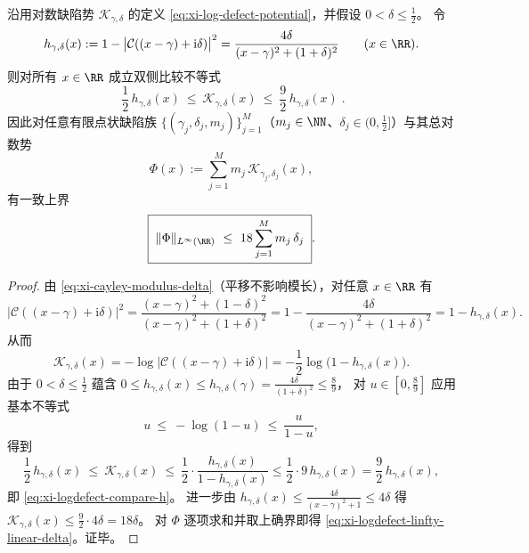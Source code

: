 \begin{proposition}\label{prop:xi-log-defect-potential-linfty-bound-by-total-delta}
沿用对数缺陷势 \(\mathcal{K}_{\gamma,\delta}\) 的定义 \eqref{eq:xi-log-defect-potential}，并假设 \(0<\delta\le \tfrac12\)。
令
\[
h_{\gamma,\delta}(x):=1-\bigl|\mathcal{C}((x-\gamma)+\mathrm{i}\delta)\bigr|^2
=\frac{4\delta}{(x-\gamma)^2+(1+\delta)^2}\qquad(x\in\RR).
\]
则对所有 \(x\in\RR\) 成立双侧比较不等式
\begin{equation}\label{eq:xi-logdefect-compare-h}
\boxed{\;
\frac12\,h_{\gamma,\delta}(x)\ \le\ \mathcal{K}_{\gamma,\delta}(x)\ \le\ \frac92\,h_{\gamma,\delta}(x)\; }.
\end{equation}
因此对任意有限点状缺陷族 \(\{(\gamma_j,\delta_j,m_j)\}_{j=1}^{M}\)（\(m_j\in\NN\)、\(\delta_j\in(0,\tfrac12]\)）与其总对数势
\[
\Phi(x):=\sum_{j=1}^{M}m_j\,\mathcal{K}_{\gamma_j,\delta_j}(x),
\]
有一致上界
\begin{equation}\label{eq:xi-logdefect-linfty-linear-delta}
\boxed{\;
\|\Phi\|_{L^\infty(\RR)}\ \le\ 18\sum_{j=1}^{M}m_j\,\delta_j\; }.
\end{equation}
\end{proposition}
\begin{proof}
由 \eqref{eq:xi-cayley-modulus-delta}（平移不影响模长），对任意 \(x\in\RR\) 有
\[
\bigl|\mathcal{C}((x-\gamma)+\mathrm{i}\delta)\bigr|^2
=\frac{(x-\gamma)^2+(1-\delta)^2}{(x-\gamma)^2+(1+\delta)^2}
=1-\frac{4\delta}{(x-\gamma)^2+(1+\delta)^2}
=1-h_{\gamma,\delta}(x).
\]
从而
\[
\mathcal{K}_{\gamma,\delta}(x)
=-\log\bigl|\mathcal{C}((x-\gamma)+\mathrm{i}\delta)\bigr|
=-\frac12\log\!\bigl(1-h_{\gamma,\delta}(x)\bigr).
\]
由于 \(0<\delta\le \tfrac12\) 蕴含 \(0\le h_{\gamma,\delta}(x)\le h_{\gamma,\delta}(\gamma)=\frac{4\delta}{(1+\delta)^2}\le \frac89\)，
对 \(u\in[0,\frac89]\) 应用基本不等式
\[
u\ \le\ -\log(1-u)\ \le\ \frac{u}{1-u},
\]
得到
\[
\frac12\,h_{\gamma,\delta}(x)\ \le\ \mathcal{K}_{\gamma,\delta}(x)\ \le\ \frac{1}{2}\cdot\frac{h_{\gamma,\delta}(x)}{1-h_{\gamma,\delta}(x)}
\le \frac{1}{2}\cdot 9\,h_{\gamma,\delta}(x)=\frac92\,h_{\gamma,\delta}(x),
\]
即 \eqref{eq:xi-logdefect-compare-h}。
进一步由 \(h_{\gamma,\delta}(x)\le \frac{4\delta}{(x-\gamma)^2+1}\le 4\delta\) 得
\(
\mathcal{K}_{\gamma,\delta}(x)\le \frac92\cdot 4\delta=18\delta
\)。
对 \(\Phi\) 逐项求和并取上确界即得 \eqref{eq:xi-logdefect-linfty-linear-delta}。证毕。
\end{proof}

\endinput

